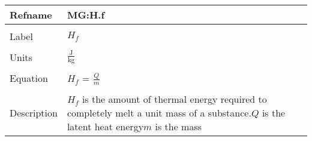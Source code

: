 \documentclass[12pt]{article}
\begin{document}
~\newline
\noindent \begin{minipage}{\textwidth}
\begin{tabular}{p{} p{}}
\toprule \textbf{Refname} & \textbf{MG:H.f}
\label{MG:H.f}
\\ \midrule \\
Label & $H_{f}$
\\ \midrule \\
Units & $\frac{\text{J}}{\text{kg}}$
\\ \midrule \\
Equation & $H_{f}$ = $\frac{Q}{m}$
\\ \midrule \\
Description & $H_{f}$ is the amount of thermal energy required to completely melt a unit mass of a substance.\newline$Q$ is the latent heat energy\newline$m$ is the mass
\\ \bottomrule \end{tabular}
\end{minipage}\\
\end{document}
